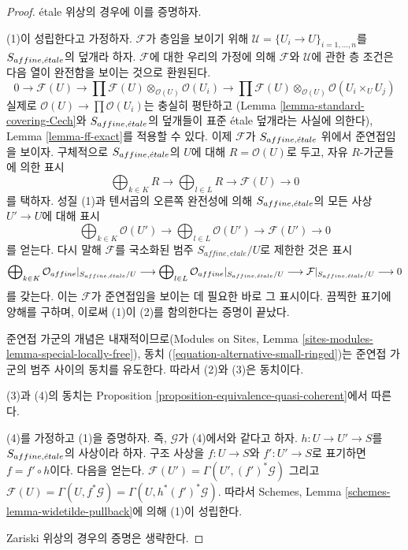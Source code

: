 \begin{proof}
\'etale 위상의 경우에 이를 증명하자.

\medskip\noindent
(1)이 성립한다고 가정하자. $\mathcal{F}$가 층임을 보이기 위해
$\mathcal{U} = \{U_i \to U\}_{i = 1, \ldots, n}$를
$S_{affine, {\acute{e}tale}}$의 덮개라 하자. $\mathcal{F}$에 대한 우리의
가정에 의해 $\mathcal{F}$와 $\mathcal{U}$에 관한 층 조건은
다음 열이 완전함을 보이는 것으로 환원된다.
$$
0 \to \mathcal{F}(U) \to
\prod \mathcal{F}(U) \otimes_{\mathcal{O}(U)} \mathcal{O}(U_i) \to
\prod \mathcal{F}(U) \otimes_{\mathcal{O}(U)} \mathcal{O}(U_i \times_U U_j)
$$
실제로 $\mathcal{O}(U) \to \prod \mathcal{O}(U_i)$는 충실히 평탄하고
(Lemma \ref{lemma-standard-covering-Cech}와 $S_{affine, {\acute{e}tale}}$의
덮개들이 표준 \'etale 덮개라는 사실에 의한다), Lemma
\ref{lemma-ff-exact}를 적용할 수 있다. 이제 $\mathcal{F}$가
$S_{affine, {\acute{e}tale}}$ 위에서 준연접임을 보이자. 구체적으로
$S_{affine, {\acute{e}tale}}$의 $U$에 대해 $R = \mathcal{O}(U)$로 두고,
자유 $R$-가군들에 의한 표시
$$
\bigoplus\nolimits_{k \in K} R
\longrightarrow
\bigoplus\nolimits_{l \in L} R
\longrightarrow
\mathcal{F}(U)
\longrightarrow 0
$$
를 택하자. 성질 (1)과 텐서곱의 오른쪽 완전성에 의해
$S_{affine, {\acute{e}tale}}$의 모든 사상 $U' \to U$에 대해 표시
$$
\bigoplus\nolimits_{k \in K} \mathcal{O}(U')
\longrightarrow
\bigoplus\nolimits_{l \in L} \mathcal{O}(U')
\longrightarrow
\mathcal{F}(U')
\longrightarrow 0
$$
를 얻는다. 다시 말해 $\mathcal{F}$를 국소화된 범주
$S_{affine, etale}/U$로 제한한 것은 표시
$$
\bigoplus\nolimits_{k \in K} \mathcal{O}_{affine}|_{S_{affine, {\acute{e}tale}}/U}
\longrightarrow
\bigoplus\nolimits_{l \in L} \mathcal{O}_{affine}|_{S_{affine, {\acute{e}tale}}/U}
\longrightarrow
\mathcal{F}|_{S_{affine, {\acute{e}tale}}/U}
\longrightarrow 0
$$
를 갖는다. 이는 $\mathcal{F}$가 준연접임을 보이는 데 필요한 바로 그
표시이다. 끔찍한 표기에 양해를 구하며, 이로써 (1)이 (2)를 함의한다는
증명이 끝났다.

\medskip\noindent
준연접 가군의 개념은 내재적이므로(Modules on Sites, Lemma
\ref{sites-modules-lemma-special-locally-free}), 동치
(\ref{equation-alternative-small-ringed})는 준연접 가군의 범주 사이의
동치를 유도한다. 따라서 (2)와 (3)은 동치이다.

\medskip\noindent
(3)과 (4)의 동치는 Proposition
\ref{proposition-equivalence-quasi-coherent}에서 따른다.

\medskip\noindent
(4)를 가정하고 (1)을 증명하자. 즉, $\mathcal{G}$가 (4)에서와 같다고
하자. $h : U \to U' \to S$를 $S_{affine, {\acute{e}tale}}$의 사상이라 하자.
구조 사상을 $f : U \to S$와 $f' : U' \to S$로 표기하면
$f = f' \circ h$이다. 다음을 얻는다.
$\mathcal{F}(U') = \Gamma(U', (f')^*\mathcal{G})$ 그리고
$\mathcal{F}(U) = \Gamma(U, f^*\mathcal{G}) = \Gamma(U, h^*(f')^*\mathcal{G})$.
따라서 Schemes, Lemma \ref{schemes-lemma-widetilde-pullback}에 의해
(1)이 성립한다.

\medskip\noindent
Zariski 위상의 경우의 증명은 생략한다.
\end{proof}





